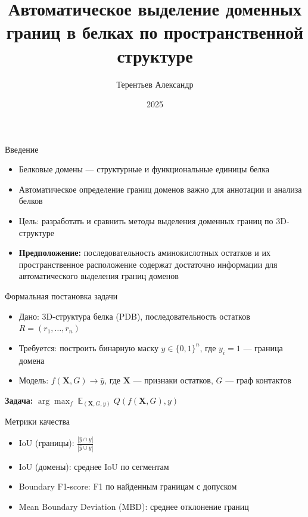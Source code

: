 \documentclass{beamer}
\title{Автоматическое выделение доменных границ в белках по пространственной структуре}
\author{Терентьев Александр}
\date{2025}
\begin{document}
\begin{frame}
  \titlepage
\end{frame}

\begin{frame}{Введение}
  \begin{itemize}
    \item Белковые домены — структурные и функциональные единицы белка
    \item Автоматическое определение границ доменов важно для аннотации и анализа белков
    \item Цель: разработать и сравнить методы выделения доменных границ по 3D-структуре
    \item \textbf{Предположение:} последовательность аминокислотных остатков и их пространственное расположение содержат достаточно информации для автоматического выделения границ доменов
  \end{itemize}
\end{frame}

\begin{frame}{Формальная постановка задачи}
  \begin{itemize}
    \item Дано: 3D-структура белка (PDB), последовательность остатков $R = (r_1, \ldots, r_n)$
    \item Требуется: построить бинарную маску $y \in \{0,1\}^n$, где $y_i=1$ — граница домена
    \item Модель: $f(\mathbf{X}, G) \to \hat{y}$, где $\mathbf{X}$ — признаки остатков, $G$ — граф контактов
  \end{itemize}
  \vspace{0.5em}
  \textbf{Задача:} $\arg\max_f \; \mathbb{E}_{(\mathbf{X}, G, y)} \; Q(f(\mathbf{X}, G), y)$
\end{frame}

\begin{frame}{Метрики качества}
  \begin{itemize}
    \item IoU (границы): $\frac{|\hat{y} \cap y|}{|\hat{y} \cup y|}$
    \item IoU (домены): среднее IoU по сегментам
    \item Boundary F1-score: F1 по найденным границам с допуском
    \item Mean Boundary Deviation (MBD): среднее отклонение границ
  \end{itemize}
\end{frame}
\end{document}
